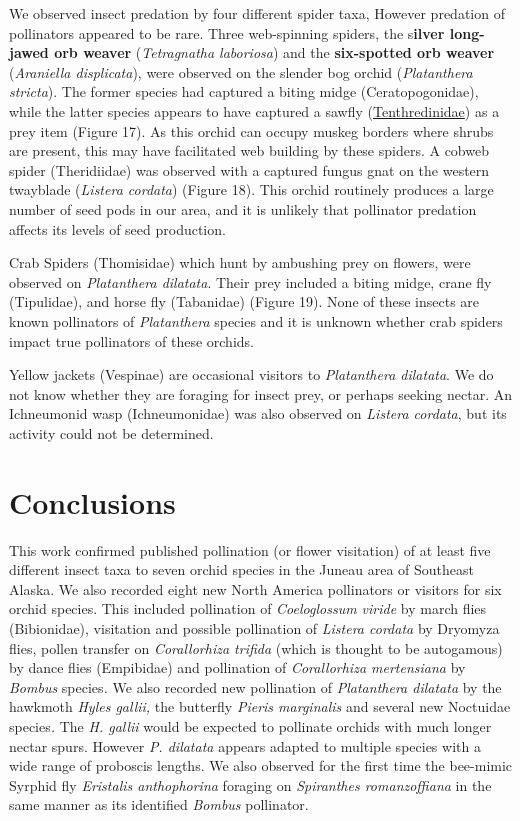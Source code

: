 \begin{multicols}{2}
We observed insect predation by four different spider taxa, However
predation of pollinators appeared to be rare. Three web-spinning
spiders, the s\textbf{ilver long-jawed orb weaver} (\emph{Tetragnatha
laboriosa}) and the \textbf{six-spotted orb weaver} (\emph{Araniella
displicata}), were observed on the slender bog orchid (\emph{Platanthera
stricta}). The former species had captured a biting midge
(Ceratopogonidae), while the latter species appears to have captured a
sawfly
(\href{https://bugguide.net/node/view/13142/bgimage}{Tenthredinidae}) as
a prey item (Figure 17). As this orchid can occupy muskeg borders where
shrubs are present, this may have facilitated web building by these
spiders. A cobweb spider (Theridiidae) was observed with a captured
fungus gnat on the western twayblade (\emph{Listera cordata}) (Figure
18). This orchid routinely produces a large number of seed pods in our
area, and it is unlikely that pollinator predation affects its levels of
seed production.

Crab Spiders (Thomisidae) which hunt by ambushing prey on flowers, were
observed on \emph{Platanthera dilatata}. Their prey included a biting
midge, crane fly (Tipulidae), and horse fly (Tabanidae) (Figure 19).
None of these insects are known pollinators of \emph{Platanthera}
species and it is unknown whether crab spiders impact true pollinators
of these orchids.

Yellow jackets (Vespinae) are occasional visitors to \emph{Platanthera
dilatata}. We do not know whether they are foraging for insect prey, or
perhaps seeking nectar. An Ichneumonid wasp (Ichneumonidae) was also
observed on \emph{Listera cordata}, but its activity could not be
determined.

\section{Conclusions}

This work confirmed published pollination (or flower visitation) of at
least five different insect taxa to seven orchid species in the Juneau
area of Southeast Alaska. We also recorded eight new North America
pollinators or visitors for six orchid species. This included
pollination of \emph{Coeloglossum viride} by march flies (Bibionidae),
visitation and possible pollination of \emph{Listera cordata} by
Dryomyza flies, pollen transfer on \emph{Corallorhiza trifida} (which is
thought to be autogamous) by dance flies (Empibidae) and pollination of
\emph{Corallorhiza mertensiana} by \emph{Bombus} species\emph{.} We also
recorded new pollination of \emph{Platanthera dilatata} by the hawkmoth
\emph{Hyles gallii,} the butterfly \emph{Pieris marginalis} and several
new Noctuidae species\emph{.} The \emph{H. gallii} would be expected to
pollinate orchids with much longer nectar spurs. However \emph{P.
dilatata} appears adapted to multiple species with a wide range of
proboscis lengths. We also observed for the first time the bee-mimic
Syrphid fly \emph{Eristalis anthophorina} foraging on \emph{Spiranthes
romanzoffiana} in the same manner as its identified \emph{Bombus}
pollinator.


\end{multicols}
